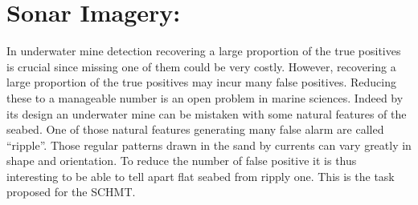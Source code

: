 \documentclass[a4paper,11pt]{report}
\begin{document}
% 		
% 		
% 		

% 		
  \section{Sonar Imagery:}
		\label{sec:Exp/Sonar:}
		
		In underwater mine detection recovering a large proportion of the true positives is crucial since missing one of them could be very costly. However, recovering a large proportion of the true positives may incur many false positives. Reducing these to a manageable number is an open problem in marine sciences. Indeed by its design an underwater mine can be mistaken with some natural features of the seabed. One of those natural features generating many false alarm are called ``ripple''. Those regular patterns drawn in the sand by currents can vary greatly in shape and orientation. To reduce the number of false positive it is thus interesting to be able to tell apart flat seabed from ripply one. This is the task proposed for the SCHMT.\\
		
\end{document}
